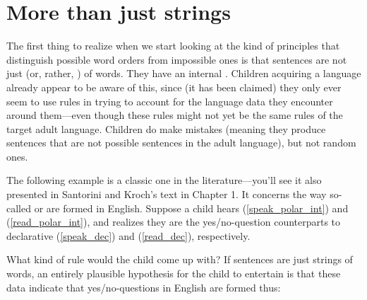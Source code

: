 \documentclass{article}
\begin{document}

\section{More than just strings}
The first thing to realize when we start looking at the kind of principles that distinguish possible word orders from impossible ones is that sentences are not just  (or, rather, )  of words.
They have an internal .
Children acquiring a language already appear to be aware of this, since (it has been claimed) they only ever seem to use  rules in trying to account for the language data they encounter around them---even though these rules might not yet be the same rules of the target adult language.
Children do make mistakes (meaning they produce sentences that are not possible sentences in the adult language), but not random ones.

The following example is a classic one in the literature---you’ll see it also presented in Santorini and Kroch’s text in Chapter 1.
It concerns the way so-called  or  are formed in English.
Suppose a child hears (\ref{speak_polar_int}) and (\ref{read_polar_int}), and realizes they are the yes/no-question counterparts to declarative (\ref{speak_dec}) and (\ref{read_dec}), respectively.
\begin{exe}
\end{exe}
What kind of rule would the child come up with? If sentences are just strings of words, an entirely plausible hypothesis for the child to entertain is that these data indicate that yes/no-questions in English are formed thus:
\end{document}
